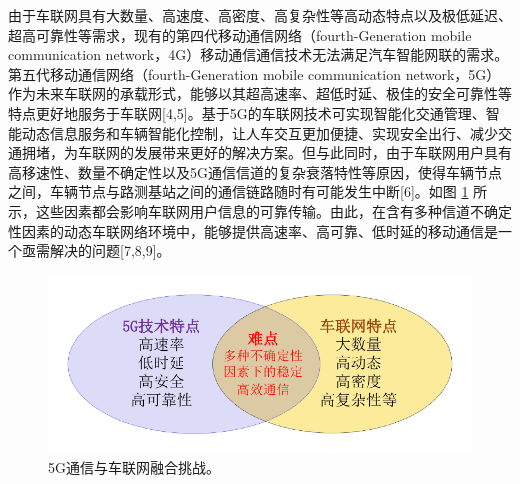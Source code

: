 \textcolor[RGB]{202,12,22}{由于车联网具有大数量、高速度、高密度、高复杂性等高动态特点以及极低延迟、超高可靠性等需求，现有的第四代移动通信网络（fourth-Generation mobile communication network，4G）移动通信通信技术无法满足汽车智能网联的需求。第五代移动通信网络（fourth-Generation mobile communication network，5G）作为未来车联网的承载形式，能够以其超高速率、超低时延、极佳的安全可靠性等特点更好地服务于车联网[4,5]。基于5G的车联网技术可实现智能化交通管理、智能动态信息服务和车辆智能化控制，让人车交互更加便捷、实现安全出行、减少交通拥堵，为车联网的发展带来更好的解决方案。但与此同时，由于车联网用户具有高移速性、数量不确定性以及5G通信信道的复杂衰落特性等原因，使得车辆节点之间，车辆节点与路测基站之间的通信链路随时有可能发生中断[6]。如图 \ref{5G通信与车联网融合挑战} 所示，这些因素都会影响车联网用户信息的可靠传输。由此，在含有多种信道不确定性因素的动态车联网络环境中，能够提供高速率、高可靠、低时延的移动通信是一个亟需解决的问题[7,8,9]。}
\begin{figure}[H]
\centering
\includegraphics[width=12cm]{figures//chap1//5G通信与车联网融合挑战.pdf}
\caption{5G通信与车联网融合挑战。}
\label{5G通信与车联网融合挑战}
\end{figure}

